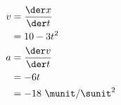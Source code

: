\begin{align*}
        v    &=   \frac{\der x}{\der t} \\
             &=   10-3t^2 \\
        a    &=   \frac{\der v}{\der t} \\
             &=  -6t  \\
             &=  -18\ \munit/\sunit^2
\end{align*}



